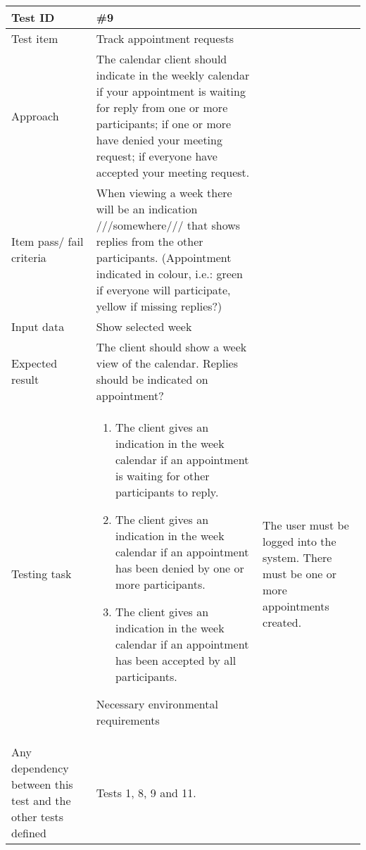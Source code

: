 \documentclass[a4paper, 10pt]{article}
\begin{document}
\begin{tabularx}{\textwidth}{ |X|X| }
\hline
{}
Test ID & \#9 \\ \hline
Test item & Track appointment requests \\ \hline
Approach & The calendar client should indicate in the weekly calendar if your appointment is waiting for reply from one or more participants; if one or more have denied your meeting request; if everyone have accepted your meeting request. \\ \hline
Item pass/ fail criteria & When viewing a week there will be an indication ///somewhere/// that shows replies from the other participants. (Appointment indicated in colour, i.e.: green if everyone will participate, yellow if missing replies?) \\ \hline
Input data & Show selected week\\ \hline
Expected result & The client should show a week view of the calendar. Replies should be indicated on appointment? \\ \hline
Testing task &
\begin{enumerate}
    \item The client gives an indication in the week calendar if an appointment is waiting for other participants to reply.
    \item The client gives an indication in the week calendar if an appointment has been denied by one or more participants.
    \item The client gives an indication in the week calendar if an appointment has been accepted by all participants.
\end{enumerate}
Necessary environmental requirements & The user must be logged into the system. There must be one or more appointments created. \\ \hline
Any dependency between this test and the other tests defined & Tests 1, 8, 9 and 11. \\ \hline


\end{tabularx}
\end{document}
